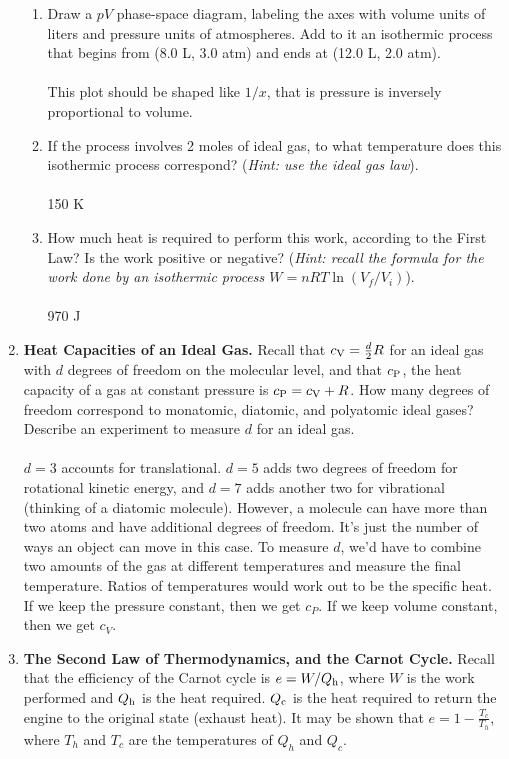 \documentclass[10pt]{article}
\begin{document}
\begin{enumerate}
\begin{enumerate}
\item Draw a $pV$ phase-space diagram, labeling the axes with volume units of liters and pressure units of atmospheres.  Add to it an isothermic process that begins from (8.0 L, 3.0 atm) and ends at (12.0 L, 2.0 atm). \\ \\ This plot should be shaped like $1/x$, that is pressure is inversely proportional to volume. \\
\item If the process involves 2 moles of ideal gas, to what temperature does this isothermic process correspond?  (\textit{Hint: use the ideal gas law}). \\ \\ 150 K \\
\item How much heat is required to perform this work, according to the First Law? Is the work positive or negative?  (\textit{Hint: recall the formula for the work done by an isothermic process $W = nRT\ln(V_f/V_i)$}). \\ \\ 970 J \\
\end{enumerate}
\item \textbf{Heat Capacities of an Ideal Gas.} Recall that $c_{\rm V} = \frac{d}{2}R$ for an ideal gas with $d$ degrees of freedom on the molecular level, and that $c_{\rm P}$, the heat capacity of a gas at constant pressure is $c_{\rm P} = c_{\rm V} + R$.  How many degrees of freedom correspond to monatomic, diatomic, and polyatomic ideal gases?  Describe an experiment to measure $d$ for an ideal gas. \\ \\ $d = 3$ accounts for translational.  $d=5$ adds two degrees of freedom for rotational kinetic energy, and $d = 7$ adds another two for vibrational (thinking of a diatomic molecule).  However, a molecule can have more than two atoms and have additional degrees of freedom.  It's just the number of ways an object can move in this case. To measure $d$, we'd have to combine two amounts of the gas at different temperatures and measure the final temperature.  Ratios of temperatures would work out to be the specific heat.  If we keep the pressure constant, then we get $c_P$.  If we keep volume constant, then we get $c_V$.\\
\item \textbf{The Second Law of Thermodynamics, and the Carnot Cycle.}  Recall that the efficiency of the Carnot cycle is $e = W/Q_{\rm h}$, where $W$ is the work performed and $Q_{\rm h}$ is the heat required.  $Q_{\rm c}$ is the heat required to return the engine to the original state (exhaust heat).  It may be shown that $e = 1 - \frac{T_c}{T_h}$, where $T_h$ and $T_c$ are the temperatures of $Q_h$ and $Q_c$.

\end{enumerate}
\end{document}

